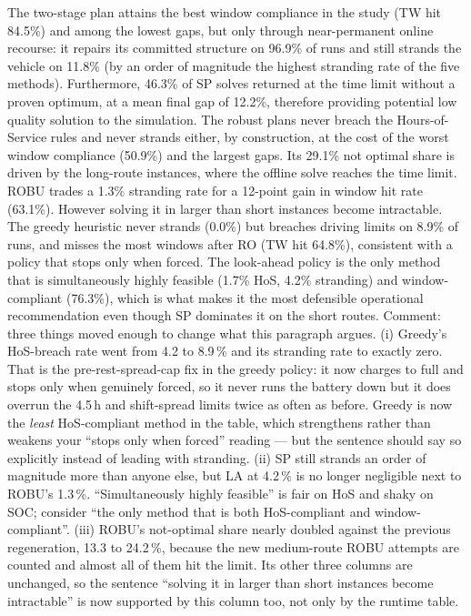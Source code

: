 \documentclass[preprint,12pt,3p]{elsarticle}
\newcommand{\green}[1]{{\color{darkgreen}#1}}
\newcommand{\blue}[1]{{\color{darkblue}#1}}
\begin{document}
The two-stage plan attains the best window compliance in the study (TW hit \blue{84.5\%}) and among the lowest gaps, but only through near-permanent online recourse: it repairs its committed structure on \blue{96.9\%} of runs and still strands the vehicle on \blue{11.8\%} (by an order of magnitude the highest stranding rate of the five methods). Furthermore, \blue{46.3\%} of SP solves returned at the time limit without a proven optimum, at a mean final gap of \blue{12.2\%}, therefore providing potential low quality solution to the simulation.
The robust plans never breach the Hours-of-Service rules and never strands either, by construction, at the cost of the worst window compliance (\blue{50.9\%}) and the largest gaps. Its \blue{29.1\%} not optimal share is driven by the long-route instances, where the offline solve reaches the time limit.
ROBU trades a \blue{1.3\%} stranding rate for a \blue{12-point} gain in window hit rate (\blue{63.1\%}). However solving it in larger than short instances become intractable.
The greedy heuristic \blue{never strands (0.0\%)} but breaches driving limits on \blue{8.9\%} of runs, and misses the most windows after RO (TW hit \blue{64.8\%}), consistent with a policy that stops only when forced.
The look-ahead policy is the only method that is simultaneously highly feasible (\blue{1.7\%} HoS, \blue{4.2\%} stranding) and window-compliant (\blue{76.3\%}), which is what makes it the most defensible operational recommendation even though SP dominates it on the short routes.
\green{Comment: three things moved enough to change what this paragraph argues.
(i) Greedy's HoS-breach rate went from 4.2 to 8.9\,\% and its stranding rate to
exactly zero. That is the pre-rest-spread-cap fix in the greedy policy: it now
charges to full and stops only when genuinely forced, so it never runs the battery
down but it does overrun the 4.5\,h and shift-spread limits twice as often as
before. Greedy is now the \emph{least} HoS-compliant method in the table, which
strengthens rather than weakens your ``stops only when forced'' reading --- but the
sentence should say so explicitly instead of leading with stranding.
(ii) SP still strands an order of magnitude more than anyone else, but LA at 4.2\,\%
is no longer negligible next to ROBU's 1.3\,\%. ``Simultaneously highly feasible''
is fair on HoS and shaky on SOC; consider ``the only method that is both
HoS-compliant and window-compliant''.
(iii) ROBU's not-optimal share nearly doubled against the previous regeneration,
13.3 to 24.2\,\%, because the new medium-route ROBU attempts are counted and almost
all of them hit the limit. Its other three columns are unchanged, so the sentence
``solving it in larger than short instances become intractable'' is now supported
by this column too, not only by the runtime table.}
\end{document}
